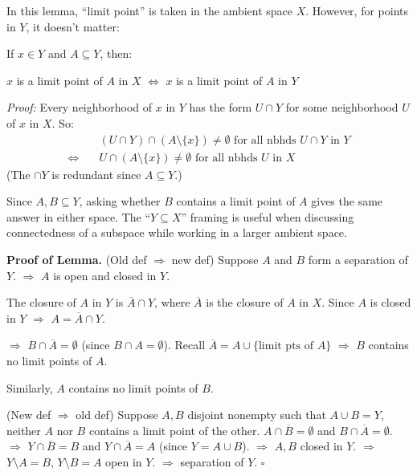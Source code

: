 \documentclass[11pt]{report}
\renewenvironment{proof}[1][Proof]{\noindent\textbf{#1.} }{\hfill$\square$\par\vspace{5pt}}
\begin{document}
\begin{rembox}
In this lemma, ``limit point'' is taken in the ambient space $X$. However, for points in $Y$, it doesn't matter:

If $x \in Y$ and $A \subseteq Y$, then:
\begin{center}
$x$ is a limit point of $A$ in $X$ $\Longleftrightarrow$ $x$ is a limit point of $A$ in $Y$
\end{center}

\textit{Proof:} Every neighborhood of $x$ in $Y$ has the form $U \cap Y$ for some neighborhood $U$ of $x$ in $X$. So:
\begin{align*}
&(U \cap Y) \cap (A \setminus \{x\}) \neq \emptyset \text{ for all nbhds } U \cap Y \text{ in } Y \\
\Longleftrightarrow\quad &U \cap (A \setminus \{x\}) \neq \emptyset \text{ for all nbhds } U \text{ in } X
\end{align*}
(The $\cap Y$ is redundant since $A \subseteq Y$.)

Since $A, B \subseteq Y$, asking whether $B$ contains a limit point of $A$ gives the same answer in either space. The ``$Y \subseteq X$'' framing is useful when discussing connectedness of a subspace while working in a larger ambient space.
\end{rembox}

\begin{proof}[Proof of Lemma]
(Old def $\Rightarrow$ new def) Suppose $A$ and $B$ form a separation of $Y$. $\Rightarrow$ $A$ is open and closed in $Y$.

The closure of $A$ in $Y$ is $\overline{A} \cap Y$, where $\overline{A}$ is the closure of $A$ in $X$. Since $A$ is closed in $Y$ $\Rightarrow$ $A = \overline{A} \cap Y$.

$\Rightarrow$ $B \cap \overline{A} = \emptyset$ (since $B \cap A = \emptyset$). Recall $\overline{A} = A \cup \{\text{limit pts of } A\}$ $\Rightarrow$ $B$ contains no limit points of $A$.

Similarly, $A$ contains no limit points of $B$.

(New def $\Rightarrow$ old def) Suppose $A, B$ disjoint nonempty such that $A \cup B = Y$, neither $A$ nor $B$ contains a limit point of the other. $A \cap \overline{B} = \emptyset$ and $B \cap \overline{A} = \emptyset$. $\Rightarrow$ $Y \cap \overline{B} = B$ and $Y \cap \overline{A} = A$ (since $Y = A \cup B$). $\Rightarrow$ $A, B$ closed in $Y$. $\Rightarrow$ $Y \setminus A = B$, $Y \setminus B = A$ open in $Y$. $\Rightarrow$ separation of $Y$.
\end{proof}
\end{document}
